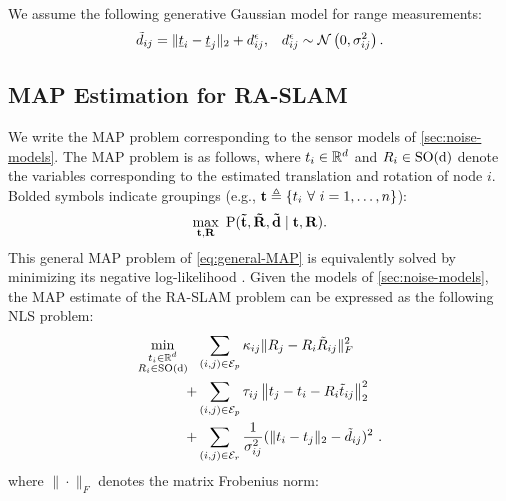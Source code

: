 We assume the following generative Gaussian model for range measurements:
\begin{equation}
    \label{eq:range-measurement-model}
    \begin{aligned}
        \tilde{d}_{i j}   & = \lVert \underline{t}_i - \underline{t}_j \rVert_2
        +{d}^{\epsilon}_{i j}, & {d}^{\epsilon}_{i j}                          & \sim \mathcal{N}\left(0, \sigma_{i j}^2 \right). \\
    \end{aligned}
\end{equation}

\subsection{MAP Estimation for RA-SLAM}

We write the MAP problem corresponding to the sensor models of
\cref{sec:noise-models}. The MAP problem is as follows, where $t_i \in
    \mathbb{R}^d$ and $R_i \in \operatorname{{\operatorname{SO}}(d)}$ denote the variables corresponding to the estimated
translation and rotation of node $i$. Bolded symbols indicate groupings (e.g.,
$\textbf{t} \triangleq \{t_i~\forall~i=1,\ldots,n \}$):
\begin{equation}
    \label{eq:general-MAP}
    \begin{array}{r}
        \max\limits_{ \bf t , \bf R } ~ \operatorname{P} ( \bf \tilde{t} , \bf \tilde{R}, \bf \tilde{d} \mid \bf t , \bf R).
    \end{array}
\end{equation}
This general MAP problem of \cref{eq:general-MAP} is equivalently solved by
minimizing its negative log-likelihood \cite{dellaert2017factor}. Given the
models of \cref{sec:noise-models}, the MAP estimate of the RA-SLAM
problem can be expressed as the following NLS problem:
\begin{equation}
    \label{eq:ra-slam-nls}
    \begin{aligned}
        \min\limits_{\substack{ t_i \in \mathbb{R}^d                                                                                    \\ R_i \in \operatorname{{\operatorname{SO}}(d)}}} ~~
          & \sum\limits_{(i,j) \in \mathcal{E}_{p}} \kappa_{ij} \lVert R_j - R_i \tilde{R}_{ij} \rVert_F^2                        \\
        + & \sum\limits_{(i,j) \in \mathcal{E}_{p}} \tau_{ij} \left \lVert t_j - t_i - R_i \tilde{t}_{ij} \right \rVert_2^2 \\
        + & \sum\limits_{(i,j) \in \mathcal{E}_{r}} \frac{1}{\sigma^2_{ij}} ( \lVert t_i - t_j \rVert_2 - \tilde{d}_{ij})^2        ~ .
    \end{aligned}
\end{equation}
where $\| \cdot \|_F$ denotes the matrix
Frobenius norm:

